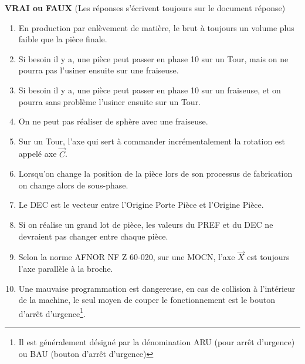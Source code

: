 \documentclass[12pt]{article}
\newcounter{exo}
\newenvironment{exo}{\stepcounter{exo}\vspace{0.5cm}{\bfseries Question \theexo\ :}}{\par\vspace{0.5cm}}
\begin{document}
\begin{center}
\end{center}


\begin{exo} \textbf{VRAI ou FAUX} (Les réponses s'écrivent toujours sur le document réponse)\end{exo} 
\begin{enumerate}[1)]
    \item En production par enlèvement de matière, le brut à toujours un volume plus faible que la pièce finale.
    \item Si besoin il y a, une pièce peut passer en phase 10 sur un Tour, mais on ne pourra pas l'usiner ensuite sur une fraiseuse.
    \item Si besoin il y a, une pièce peut passer en phase 10 sur un fraiseuse, et on pourra sans problème l'usiner ensuite sur un Tour. 
    \item On ne peut pas réaliser de sphère avec une fraiseuse.
    \item Sur un Tour, l'axe qui sert à commander incrémentalement la rotation est appelé axe $\Vec{C}$.
    \item Lorsqu'on change la position de la pièce lors de son processus de fabrication on change alors de sous-phase.
    \item Le DEC est le vecteur entre l'Origine Porte Pièce et l'Origine Pièce.
    \item Si on réalise un grand lot de pièce, les valeurs du PREF et du DEC ne devraient pas changer entre chaque pièce.
    \item Selon la norme AFNOR NF Z 60-020, sur une MOCN, l'axe $\Vec{X}$ est toujours l'axe parallèle à la broche.
    \item Une mauvaise programmation est dangereuse, en cas de collision à l'intérieur de la machine, le seul moyen de couper le fonctionnement est le bouton d'arrêt d'urgence\footnote{Il est généralement désigné par la dénomination ARU (pour arrêt d'urgence) ou BAU (bouton d'arrêt d'urgence)}.
\end{enumerate}
\end{document}
